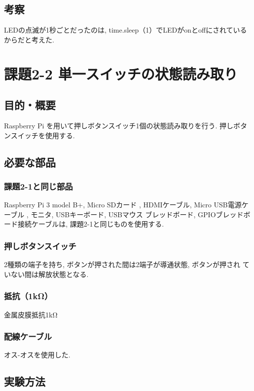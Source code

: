 \documentclass{ltjsarticle} %
\begin{document}
\subsection{考察}

LEDの点滅が1秒ごとだったのは,  time.sleep（1）でLEDがonとoffにされているからだと考えた. 


\section{課題2-2 単⼀スイッチの状態読み取り}

\subsection{目的・概要}
Raspberry Pi を⽤いて押しボタンスイッチ1個の状態読み取りを⾏う. 
押しボタンスイッチを使⽤する. 

\subsection{必要な部品}

\subsubsection{課題2-1と同じ部品}
Raspberry Pi 3 model B+, Micro SDカード
, HDMIケーブル, Micro USB電源ケーブル
, モニタ, USBキーボード, USBマウス
ブレッドボード, GPIOブレッドボード接続ケーブルは, 
課題2-1と同じものを使用する.

\subsubsection{押しボタンスイッチ}
2種類の端⼦を持ち, ボタンが押された間は2端⼦が導通状態, ボタンが押され
ていない間は解放状態となる.

\subsubsection{抵抗（1kΩ）}
金属皮膜抵抗1kΩ

\subsubsection{配線ケーブル}
オス-オスを使用した.

\subsection{実験方法}
\end{document}
